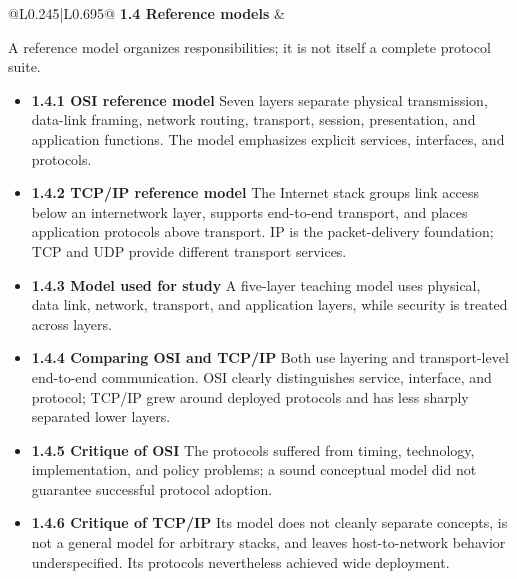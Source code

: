 \documentclass[10pt,letterpaper]{article}
\begin{document}
\begin{longtable}{@{}L{0.245\textwidth}|L{0.695\textwidth}@{}}
\textbf{1.4 Reference models} & \begin{minipage}[t]{\linewidth}\raggedright A reference model organizes responsibilities; it is not itself a complete protocol suite.\par\begin{itemize}\item \textbf{1.4.1 OSI reference model} Seven layers separate physical transmission, data-link framing, network routing, transport, session, presentation, and application functions. The model emphasizes explicit services, interfaces, and protocols.\item \textbf{1.4.2 TCP/IP reference model} The Internet stack groups link access below an internetwork layer, supports end-to-end transport, and places application protocols above transport. IP is the packet-delivery foundation; TCP and UDP provide different transport services.\item \textbf{1.4.3 Model used for study} A five-layer teaching model uses physical, data link, network, transport, and application layers, while security is treated across layers.\item \textbf{1.4.4 Comparing OSI and TCP/IP} Both use layering and transport-level end-to-end communication. OSI clearly distinguishes service, interface, and protocol; TCP/IP grew around deployed protocols and has less sharply separated lower layers.\item \textbf{1.4.5 Critique of OSI} The protocols suffered from timing, technology, implementation, and policy problems; a sound conceptual model did not guarantee successful protocol adoption.\item \textbf{1.4.6 Critique of TCP/IP} Its model does not cleanly separate concepts, is not a general model for arbitrary stacks, and leaves host-to-network behavior underspecified. Its protocols nevertheless achieved wide deployment.\end{itemize}\end{minipage} \\ \hline

\end{longtable}
\end{document}
